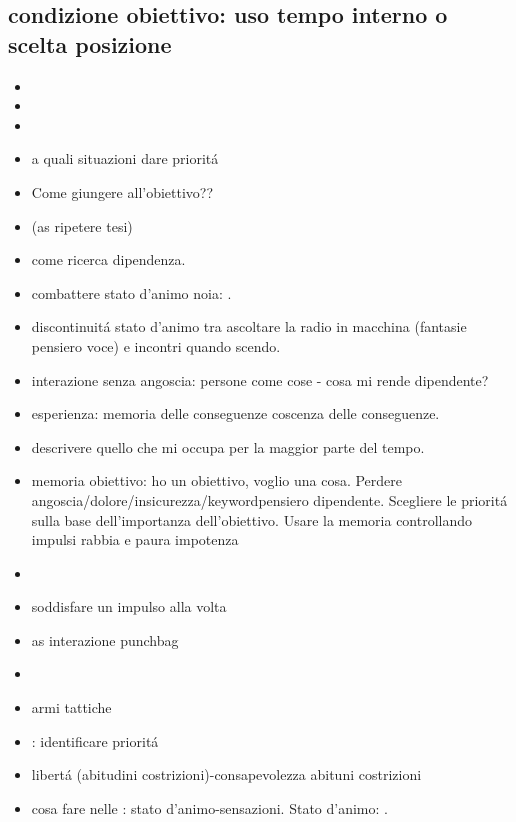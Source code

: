 \subsection{condizione obiettivo: uso tempo interno o scelta posizione}

\begin{itemize}
\item {}
\item {}
\item {}
\item a quali situazioni dare priorit\'a
\item Come giungere all'obiettivo??
\item {} (as ripetere tesi)
\item {} come ricerca dipendenza.
\item combattere stato d'animo noia: .
\item discontinuit\'a stato d'animo tra ascoltare la radio in macchina (fantasie pensiero voce) e incontri quando scendo.
\item interazione senza angoscia: persone come cose - cosa mi rende dipendente?
\item esperienza: memoria delle conseguenze coscenza delle conseguenze.
\item descrivere quello che mi occupa per la maggior parte del tempo.
\item memoria obiettivo: ho un obiettivo, voglio una cosa. Perdere angoscia/dolore/insicurezza/keyword{pensiero dipendente}. Scegliere le priorit\'a sulla base dell'importanza dell'obiettivo.
Usare la memoria controllando impulsi rabbia e paura impotenza
\item {}
\item soddisfare un impulso alla volta
\item {} as interazione punchbag
\item {}
\item armi tattiche
\item {}: identificare priorit\'a
\item libert\'a (abitudini costrizioni)-consapevolezza abituni costrizioni
\item cosa fare nelle : stato d'animo-sensazioni.
Stato d'animo: .

\end{itemize}
